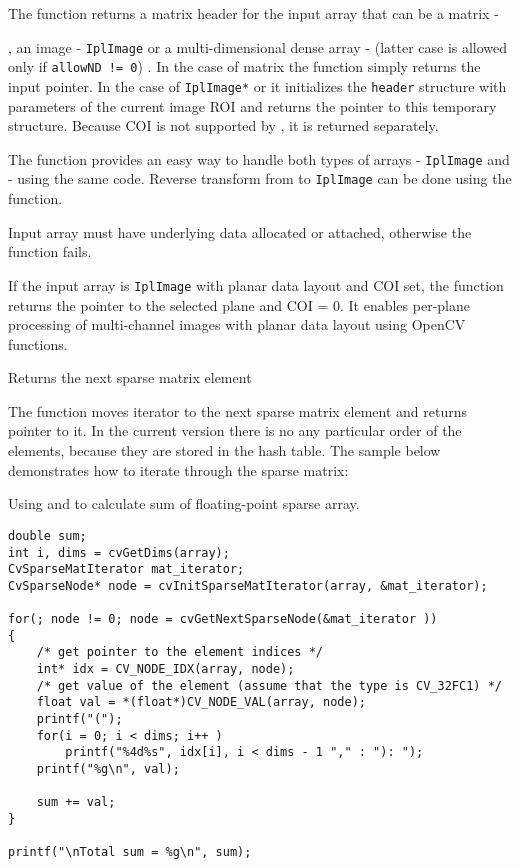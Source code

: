 The function returns a matrix header for the input array that can be a matrix - 

, an image - \texttt{IplImage} or a multi-dimensional dense array -  (latter case is allowed only if \texttt{allowND != 0}) . In the case of matrix the function simply returns the input pointer. In the case of \texttt{IplImage*} or  it initializes the \texttt{header} structure with parameters of the current image ROI and returns the pointer to this temporary structure. Because COI is not supported by , it is returned separately.

The function provides an easy way to handle both types of arrays - \texttt{IplImage} and  - using the same code. Reverse transform from  to \texttt{IplImage} can be done using the  function.

Input array must have underlying data allocated or attached, otherwise the function fails.

If the input array is \texttt{IplImage} with planar data layout and COI set, the function returns the pointer to the selected plane and COI = 0. It enables per-plane processing of multi-channel images with planar data layout using OpenCV functions.

\ifC
{} 
Returns the next sparse matrix element


\begin{description}
\end{description}


The function moves iterator to the next sparse matrix element and returns pointer to it. In the current version there is no any particular order of the elements, because they are stored in the hash table. The sample below demonstrates how to iterate through the sparse matrix:

Using  and  to calculate sum of floating-point sparse array.

\begin{lstlisting}
double sum;
int i, dims = cvGetDims(array);
CvSparseMatIterator mat_iterator;
CvSparseNode* node = cvInitSparseMatIterator(array, &mat_iterator);

for(; node != 0; node = cvGetNextSparseNode(&mat_iterator ))
{
    /* get pointer to the element indices */
    int* idx = CV_NODE_IDX(array, node);
    /* get value of the element (assume that the type is CV_32FC1) */
    float val = *(float*)CV_NODE_VAL(array, node);
    printf("(");
    for(i = 0; i < dims; i++ )
        printf("%4d%s", idx[i], i < dims - 1 "," : "): ");
    printf("%g\n", val);

    sum += val;
}

printf("\nTotal sum = %g\n", sum);
\end{lstlisting}

